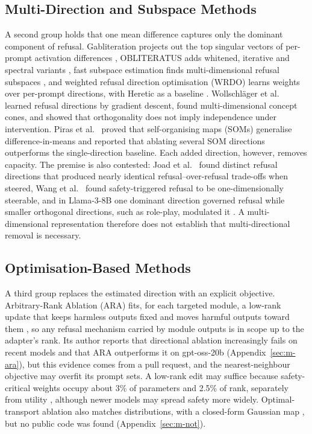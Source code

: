 \subsection{Multi-Direction and Subspace Methods}

A second group holds that one mean difference captures only the dominant
component of refusal. Gabliteration projects out the top singular vectors of
per-prompt activation differences \cite{gabliteration2024}, OBLITERATUS adds
whitened, iterative and spectral variants \cite{obliteratus2026}, fast subspace
estimation finds multi-dimensional refusal subspaces \cite{winninger2026fast},
and weighted refusal direction optimisation (WRDO) learns weights over
per-prompt directions, with Heretic as a baseline \cite{evseev2026wrdo}.
Wollschl\"ager et al.~\cite{wollschlager2025geometry} learned refusal
directions by gradient descent, found multi-dimensional concept cones, and
showed that orthogonality does not imply independence under intervention.
Piras et al.~\cite{piras2025som} proved that self-organising maps (SOMs)
generalise difference-in-means and reported that ablating several SOM
directions outperforms the single-direction baseline. Each added direction,
however, removes capacity. The premise is also
contested: Joad et al.~\cite{joad2026there} found distinct refusal directions
that produced nearly identical refusal--over-refusal trade-offs when steered,
Wang et al.~\cite{wang2026on} found safety-triggered refusal to be
one-dimensionally steerable, and in Llama-3-8B one dominant direction governed
refusal while smaller orthogonal directions, such as role-play, modulated it
\cite{pan2025hidden}. A multi-dimensional representation therefore does not
establish that multi-directional removal is necessary.

\subsection{Optimisation-Based Methods}

A third group replaces the estimated direction with an explicit objective.
Arbitrary-Rank Ablation (ARA) fits, for each targeted module, a low-rank
update that keeps harmless outputs fixed and moves harmful outputs toward them
\cite{weidmann2026ara}, so any refusal mechanism carried by module outputs is
in scope up to the adapter's rank. Its author reports that directional ablation
increasingly fails on recent models and that ARA outperforms it on gpt-oss-20b
(Appendix~\ref{sec:m-ara}), but this evidence comes from a pull request, and
the nearest-neighbour objective may overfit its prompt sets. A low-rank edit may suffice because safety-critical weights occupy about 3\% of parameters and 2.5\% of rank,
separately from utility \cite{wei2024assessing}, although newer models may
spread safety more widely. Optimal-transport ablation also
matches distributions, with a closed-form Gaussian map \cite{nanfack2026ot},
but no public code was found (Appendix~\ref{sec:m-not}).

